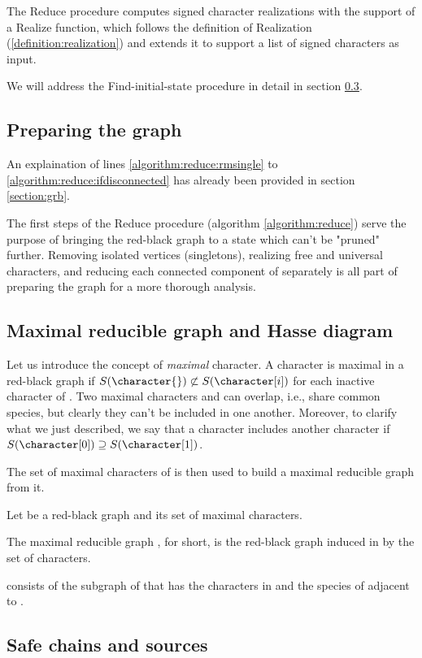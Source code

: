The Reduce procedure computes signed character realizations with the support of a Realize function, which follows the definition of Realization (\ref{definition:realization}) and extends it to support a list of signed characters as input.

We will address the Find-initial-state procedure in detail in section \ref{section:safe-chains-sources}.

\subsection{Preparing the graph}\label{section:preparing-the-graph}

An explaination of lines \ref{algorithm:reduce:rmsingle} to \ref{algorithm:reduce:ifdisconnected} has already been provided in section \ref{section:grb}.

The first steps of the Reduce procedure (algorithm \ref{algorithm:reduce}) serve the purpose of bringing the red-black graph to a state which can't be "pruned" further.
Removing isolated vertices (singletons), realizing free and universal characters, and reducing each connected component of \grb{} separately is all part of preparing the graph for a more thorough analysis.

\subsection{Maximal reducible graph and Hasse diagram}\label{section:gm-hassediagram}

Let us introduce the concept of \emph{maximal} character. A character \character{} is maximal in a red-black graph \grb{} if $S(\character{}) \not\subset S(\character[i])$ for each inactive character \character[i] of \grb{}. Two maximal characters \character[0] and \character[1] can overlap, i.e., share common species, but clearly they can't be included in one another. Moreover, to clarify what we just described, we say that a character \character[0] includes another character \character[1] if $S(\character[0]) \supseteq S(\character[1])$.

The set of maximal characters of \grb{} is then used to build a maximal reducible graph \grbcm{} from it.

\begin{definition}\label{definition:maximal-reducible-graph}
  Let \grb{} be a red-black graph and \cm{} its set of maximal characters.

  The maximal reducible graph \grbcm{}, \gm{} for short, is the red-black graph induced in \grb{} by the set \cm{} of characters.

  \gm{} consists of the subgraph of \grb{} that has the characters in \cm{} and the species of \grb{} adjacent to \cm{}.
\end{definition}


\subsection{Safe chains and sources}\label{section:safe-chains-sources}
